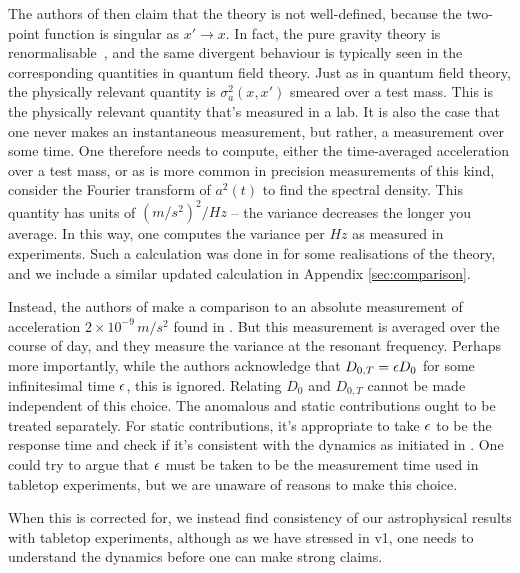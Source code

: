 \documentclass[aps,pra,amsmath,amssymb,amsthm,floatfix,nofootinbib,notitlepage,superscriptaddress,10pt]{revtex4-2}
\begin{document}
The authors of \cite{hertzberg2024comment} then claim that the theory is not well-defined, because the two-point function is singular as $x'\to x$.  In fact, the pure gravity theory is renormalisable~\cite{grudka2023renormalisable}, and the same divergent behaviour is typically seen in the corresponding quantities in quantum field theory. Just as in quantum field theory, the physically relevant quantity is $\sigma^2_a(x,x')$ smeared over a test mass. This is the physically relevant quantity that's measured in a lab. It is also the case that one never makes an instantaneous measurement, but rather, a measurement over some time. One therefore needs to compute, either the time-averaged acceleration over a test mass, or as is more common in precision measurements of this kind, consider the Fourier transform of $a^2(t)$ to find the spectral density.  This quantity has units of $\unit{(m/s^2)^2/Hz}$ -- the variance decreases the longer you average. In this way, one computes the variance per $Hz$ as measured in experiments. Such a calculation was done in \cite{oppenheim2023gravitationally} for some realisations of the theory, and we include a similar updated calculation in Appendix \ref{sec:comparison}. 

Instead, the authors of  \cite{hertzberg2024comment} make a comparison to an absolute measurement of acceleration $2\times10^{-9}\,\unit{m/s^2}$ found in \cite{hoyle2004submillimeter}. But this measurement is averaged over the course of day, and they measure the variance at the resonant frequency. Perhaps more importantly,
while the authors acknowledge that $D_{0,T}=\epsilon D_0$ for some infinitesimal time $\epsilon$, this is ignored.  Relating $D_0$ and $D_{0,T}$ cannot be made independent of this choice.  
The anomalous and static contributions ought to be treated separately. For static contributions, it's appropriate to take $\epsilon$ to be the response time and check if it's consistent with the dynamics as initiated in \cite{UCLcosmo}. One could try to argue that $\epsilon$ must be taken to be the measurement time used in tabletop experiments, but we are unaware of 
reasons to make this choice.

When this is corrected for, we instead find consistency of our astrophysical results with tabletop experiments, although as we have stressed in v1, one needs to understand the dynamics before one can make strong claims.
\end{document}
